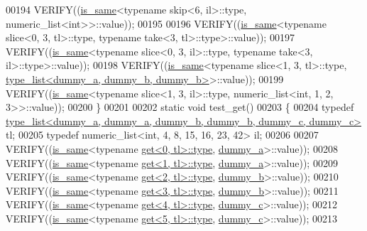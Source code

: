 \begin{DoxyCode}
00194   VERIFY((\hyperlink{struct_eigen_1_1internal_1_1is__same}{is\_same}<\textcolor{keyword}{typename} skip<6, il>::type, numeric\_list<int>>::value));
00195 
00196   VERIFY((\hyperlink{struct_eigen_1_1internal_1_1is__same}{is\_same}<\textcolor{keyword}{typename} slice<0, 3, tl>::type, \textcolor{keyword}{typename} take<3, tl>::type>::value));
00197   VERIFY((\hyperlink{struct_eigen_1_1internal_1_1is__same}{is\_same}<\textcolor{keyword}{typename} slice<0, 3, il>::type, \textcolor{keyword}{typename} take<3, il>::type>::value));
00198   VERIFY((\hyperlink{struct_eigen_1_1internal_1_1is__same}{is\_same}<\textcolor{keyword}{typename} slice<1, 3, tl>::type, 
      \hyperlink{struct_eigen_1_1internal_1_1type__list}{type\_list<dummy\_a, dummy\_b, dummy\_b>}>::value));
00199   VERIFY((\hyperlink{struct_eigen_1_1internal_1_1is__same}{is\_same}<\textcolor{keyword}{typename} slice<1, 3, il>::type, numeric\_list<int, 1, 2, 3>>::value));
00200 \}
00201 
00202 \textcolor{keyword}{static} \textcolor{keywordtype}{void} test\_get()
00203 \{
00204   \textcolor{keyword}{typedef} \hyperlink{struct_eigen_1_1internal_1_1type__list}{type\_list<dummy\_a, dummy\_a, dummy\_b, dummy\_b, dummy\_c, dummy\_c>}
       tl;
00205   \textcolor{keyword}{typedef} numeric\_list<int, 4, 8, 15, 16, 23, 42> il;
00206 
00207   VERIFY((\hyperlink{struct_eigen_1_1internal_1_1is__same}{is\_same}<\textcolor{keyword}{typename} \hyperlink{struct_eigen_1_1internal_1_1get}{get<0, tl>::type}, \hyperlink{structdummy__a}{dummy\_a}>::value));
00208   VERIFY((\hyperlink{struct_eigen_1_1internal_1_1is__same}{is\_same}<\textcolor{keyword}{typename} \hyperlink{struct_eigen_1_1internal_1_1get}{get<1, tl>::type}, \hyperlink{structdummy__a}{dummy\_a}>::value));
00209   VERIFY((\hyperlink{struct_eigen_1_1internal_1_1is__same}{is\_same}<\textcolor{keyword}{typename} \hyperlink{struct_eigen_1_1internal_1_1get}{get<2, tl>::type}, \hyperlink{structdummy__b}{dummy\_b}>::value));
00210   VERIFY((\hyperlink{struct_eigen_1_1internal_1_1is__same}{is\_same}<\textcolor{keyword}{typename} \hyperlink{struct_eigen_1_1internal_1_1get}{get<3, tl>::type}, \hyperlink{structdummy__b}{dummy\_b}>::value));
00211   VERIFY((\hyperlink{struct_eigen_1_1internal_1_1is__same}{is\_same}<\textcolor{keyword}{typename} \hyperlink{struct_eigen_1_1internal_1_1get}{get<4, tl>::type}, \hyperlink{structdummy__c}{dummy\_c}>::value));
00212   VERIFY((\hyperlink{struct_eigen_1_1internal_1_1is__same}{is\_same}<\textcolor{keyword}{typename} \hyperlink{struct_eigen_1_1internal_1_1get}{get<5, tl>::type}, \hyperlink{structdummy__c}{dummy\_c}>::value));
00213 

\end{DoxyCode}

